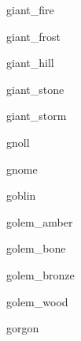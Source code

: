 \documentclass[letterpaper,serif]{module}
\begin{document}
\begin{newmonster}{giant_fire}\end{newmonster}

\begin{newmonster}{giant_frost}\end{newmonster}

\begin{newmonster}{giant_hill}\end{newmonster}

\begin{newmonster}{giant_stone}\end{newmonster}

\begin{newmonster}{giant_storm}\end{newmonster}

\begin{newmonster}{gnoll}\end{newmonster}

\begin{newmonster}{gnome}\end{newmonster}

\begin{newmonster}{goblin}\end{newmonster}

\begin{newmonster}{golem_amber}\end{newmonster}

\begin{newmonster}{golem_bone}\end{newmonster}

\begin{newmonster}{golem_bronze}\end{newmonster}

\begin{newmonster}{golem_wood}\end{newmonster}

\begin{newmonster}{gorgon}\end{newmonster}
\end{document}
